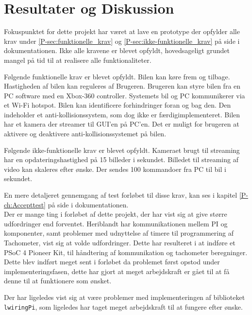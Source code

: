 \chapter{Resultater og Diskussion} \label{ch:Resultater_og_diskussion}

Fokuspunktet for dette projekt har været at lave en prototype der opfylder alle krav under \ref{P-sec:funktionelle_krav}  og \ref{P-sec:ikke-funktionelle_krav}  på side \pageref{P-sec:funktionelle_krav} i dokumentationen. Ikke alle kravene er blevet opfyldt, hovedsageligt grundet mangel på tid til at realisere alle funktionaliteter.

Følgende funktionelle krav er blevet opfyldt. Bilen kan køre frem og tilbage. Hastigheden af bilen kan reguleres af Brugeren. Brugeren kan styre bilen fra en PC software med en Xbox-360 controller. Systemets bil og PC kommunikerer via et Wi-Fi hotspot.  Bilen kan identificere forhindringer foran og bag den. Den indeholder et anti-kollisionssystem, som dog ikke er færdigimplementeret. Bilen har et kamera der streamer til GUI'en på PC'en. Det er muligt for brugeren at aktivere og deaktivere anti-kollisionssystemet på bilen.

Følgende ikke-funktionelle krav er blevet opfyldt. Kameraet brugt til streaming har en opdateringshastighed på 15 billeder i sekundet. Billedet til streaming af video kan skaleres efter ønske. Der sendes 100 kommandoer fra PC til bil i sekundet.

En mere detaljeret gennemgang af test forløbet til disse krav, kan ses i kapitel \ref{P-ch:Accepttest}  på side \pageref{P-ch:Accepttest} i dokumentationen.\\

Der er mange ting i forløbet af dette projekt, der har vist sig at give større udfordringer end forventet. Heriblandt har \IIC kommunikationen mellem PI og \IIC komponenter, samt problemer med udnyttelse af timere til programmering af Tachometer, vist sig at volde udfordringer. Dette har resulteret i at indføre et PSoC 4 Pioneer Kit, til håndtering af \IIC kommunikation og tachometer beregninger. Dette blev indført meget sent i forløbet da problemet først opstod under implementeringsfasen, dette har gjort at meget arbejdskraft er gået til at få denne til at funktionere som ønsket.

Der har ligeledes vist sig at være problemer med implementeringen af biblioteket \texttt{lwiringPi}, som ligeledes har taget meget arbejdskraft til at fungere efter ønske.

